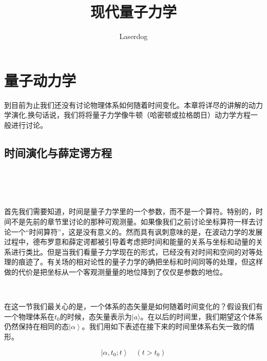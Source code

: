 \documentclass[UTF8,twoside]{ctexart}
\begin{document}
\setcounter{section}{1}
\title{现代量子力学}
\author{Laserdog}

\maketitle
\thispagestyle{empty}

\cleardoublepage
{}
\tableofcontents
\clearpage
\section{量子动力学}
\noindent 到目前为止我们还没有讨论物理体系如何随着时间变化。本章将详尽的讲解的动力学演化,换句话说，我们将将量子力学像牛顿（哈密顿或拉格朗日）动力学方程一般进行讨论。

\subsection{时间演化与薛定谔方程}

\noindent \\

\noindent {}  \\

\


\noindent 首先我们需要知道，时间是量子力学里的一个参数，而不是一个算符。特别的，时间不是先前的章节里讨论的那种可观测量。如果像我们之前讨论坐标算符一样去讨论一个“时间算符”，这是没有意义的。然而具有讽刺意味的是，在波动力学的发展过程中，德布罗意和薛定谔都被引导着考虑把时间和能量的关系与坐标和动量的关系进行类比。但是当我们看量子力学现在的形式，已经没有对时间和空间的对等处理的痕迹了。有关场的相对论性的量子力学的确把坐标和时间同等的处理，但这样做的代价是把坐标从一个客观测量量的地位降到了仅仅是参数的地位。

\ 




\noindent 在这一节我们最关心的是，一个体系的态矢量是如何随着时间变化的？假设我们有一个物理体系在$t_0$的时候，态矢量表示为$|a\rangle$。在以后的时间里，我们期望这个体系仍然保持在相同的态$\left|\alpha \right\rangle$。我们用如下表述在接下来的时间里体系右矢一致的情形。

\begin{equation}
\left|\alpha, t_0; t\right\rangle\quad(t>t_0)
\end{equation}
\end{document}
